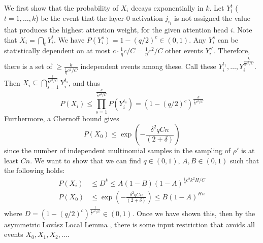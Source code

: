 \documentclass[11pt,a4paper]{article}
\begin{document}
We first show that the probability of $X_i$ decays exponentially in $k$.
Let $Y_i^t$ ($t=1,\dots,k$) be the event that the layer-0 activation $j_{i_t}$ is not assigned the value that produces the highest attention weight, for the given attention head $i$.
Note that $X_i = \bigcap_t Y_i^t$.
We have $P(Y_i^s) = 1-(q/2)^c \in (0,1)$. %
Any $Y_i^s$ can be statistically dependent on at most $c \cdot \frac{1}{\eta}c/C = \frac{1}{\eta}c^2/C$ other events $Y_i^{s'}$.
Therefore, there is a set of $\geq \frac{k}{\frac{1}{\eta}c^2/C}$ independent events among these.
Call these $Y_i^{t_1}, \dots, Y_i^{\frac{k}{\frac{1}{\eta}c^2/C}}$.
Then $X_i \subseteq \bigcap_{s=1}^{\frac{k}{\frac{1}{\eta}c^2/C}} Y_i^{t_s}$, and thus
\begin{equation}
    P(X_i) \leq \prod_{s=1}^{\frac{k}{\frac{1}{\eta}c^2/C}} P(Y_i^{t_s}) = \left(1-(q/2)^c\right)^{\frac{k}{\frac{1}{\eta}c^2/C}}
\end{equation}
Furthermore, a Chernoff bound gives~\cite{mitzenmacherprobability}
\begin{equation}
P(X_0) \leq    \exp\left(-\frac{\delta^2qCn}{(2+\delta)}\right)
\end{equation}
since the number of independent multinomial samples in the sampling of $\rho'$ is at least $Cn$.
We want to show that we can find $q \in (0,1)$, $A, B \in (0,1)$ such that the following holds: %
\begin{align}
 P(X_i) &\leq  D^k \leq A(1-B)(1-A)^{\frac{1}{\eta}c^2k^2H/C} \\
P(X_0) &\leq \exp\left(-\frac{\delta^2qCn}{(2+\delta)}\right)  \leq B (1-A)^{Hn}
\end{align}
where $D =  \left(1-(q/2)^c\right)^{\frac{1}{\frac{1}{\eta}c^2/C}} \in (0,1)$. %
Once we have shown this, then by the asymmetric Lov{\'a}sz Local Lemma \cite{mitzenmacherprobability}, there is some input restriction that avoids all events $X_0, X_1, X_2, \dots$.
\end{document}
